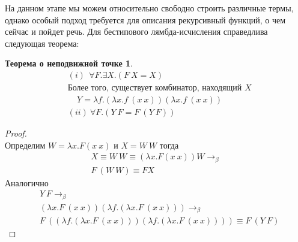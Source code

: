 \documentclass[lambda.tex]{subfiles}
\begin{document}
\begin{tcolorbox}
На данном этапе мы можем относительно свободно строить различные термы, однако особый подход требуется для описания рекурсивный функций, о чем сейчас и пойдет речь. Для бестипового лямбда-исчисления справедлива следующая теорема:
\newtheorem*{fixpoint}{Теорема о неподвижной точке}
\begin{fixpoint}
\begin{align*}
&(i)\ \ \forall F. \exists X. (F\ X = X) \\
&\text{Более того, существует комбинатор, находящий $X$}\\
&\ \ \ \ \ Y = \lambda f.(\lambda x.f\ (x\ x)) (\lambda x.f\ (x\ x))\\
&(ii)\ \forall F.(Y\ F=F\ (Y\ F))
\end{align*}
\end{fixpoint}

\begin{proof}
~\\
Определим $W = \lambda x.F(x\ x)$ и $X = W\ W$ тогда
\begin{align*}
X \equiv W\ W \equiv (\lambda x.F(x\ x))W \rightarrow_\beta\\
F\ (W\ W) \equiv F X
\end{align*}
Аналогично
\begin{align*}
&Y\ F \rightarrow_\beta\\
&(\lambda x.F\ (x\ x)) (\lambda f.(\lambda x.F\ (x\ x))) \rightarrow_\beta\\
&F\ ((\lambda f.(\lambda x.F\ (x\ x))) (\lambda f.(\lambda x.F\ (x\ x)))) \equiv F\ (Y\ F)
\end{align*}
\end{proof}


\end{tcolorbox}
\end{document}
